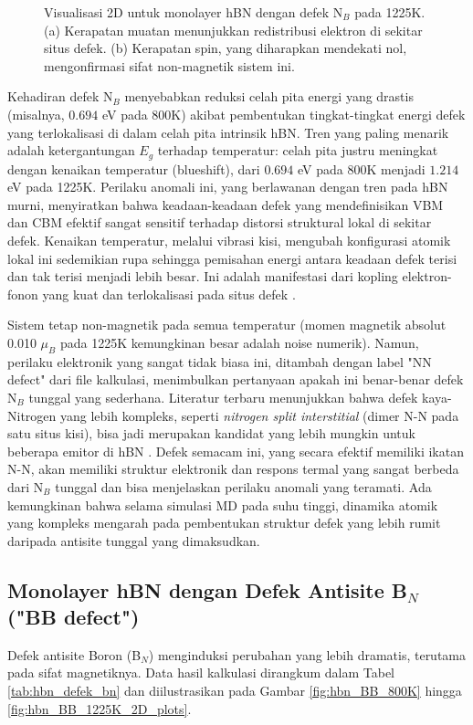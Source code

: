 \begin{figure}[h!]
    \caption{Visualisasi 2D untuk monolayer hBN dengan defek N$_B$ pada 1225K. 
    (a) Kerapatan muatan menunjukkan redistribusi elektron di sekitar situs defek. 
    (b) Kerapatan spin, yang diharapkan mendekati nol, mengonfirmasi sifat non-magnetik sistem ini.}
    \label{fig:hbn_NB_1225K_2D_plots}
\end{figure}

Kehadiran defek N$_B$ menyebabkan reduksi celah pita energi yang drastis (misalnya, $0.694$ eV pada 800K) akibat pembentukan tingkat-tingkat energi defek yang terlokalisasi di dalam celah pita intrinsik hBN. Tren yang paling menarik adalah ketergantungan $E_g$ terhadap temperatur: celah pita justru meningkat dengan kenaikan temperatur (blueshift), dari $0.694$ eV pada 800K menjadi $1.214$ eV pada 1225K. Perilaku anomali ini, yang berlawanan dengan tren pada hBN murni, menyiratkan bahwa keadaan-keadaan defek yang mendefinisikan VBM dan CBM efektif sangat sensitif terhadap distorsi struktural lokal di sekitar defek. Kenaikan temperatur, melalui vibrasi kisi, mengubah konfigurasi atomik lokal ini sedemikian rupa sehingga pemisahan energi antara keadaan defek terisi dan tak terisi menjadi lebih besar. Ini adalah manifestasi dari kopling elektron-fonon yang kuat dan terlokalisasi pada situs defek \citep{Grosso2020,ozan2025}.

Sistem tetap non-magnetik pada semua temperatur (momen magnetik absolut 0.010 $\mu_B$ pada 1225K kemungkinan besar adalah noise numerik). Namun, perilaku elektronik yang sangat tidak biasa ini, ditambah dengan label "NN defect" dari file kalkulasi, menimbulkan pertanyaan apakah ini benar-benar defek N$_B$ tunggal yang sederhana. Literatur terbaru menunjukkan bahwa defek kaya-Nitrogen yang lebih kompleks, seperti \textit{nitrogen split interstitial} (dimer N-N pada satu situs kisi), bisa jadi merupakan kandidat yang lebih mungkin untuk beberapa emitor di hBN \citep{ganyecz2024}. Defek semacam ini, yang secara efektif memiliki ikatan N-N, akan memiliki struktur elektronik dan respons termal yang sangat berbeda dari N$_B$ tunggal dan bisa menjelaskan perilaku anomali yang teramati. Ada kemungkinan bahwa selama simulasi MD pada suhu tinggi, dinamika atomik yang kompleks mengarah pada pembentukan struktur defek yang lebih rumit daripada antisite tunggal yang dimaksudkan.


\subsection{Monolayer hBN dengan Defek Antisite B$_N$ ("BB defect")}
\label{subsec:hbn_defek_bn}
Defek antisite Boron (B$_N$) menginduksi perubahan yang lebih dramatis, terutama pada sifat magnetiknya. Data hasil kalkulasi dirangkum dalam Tabel \ref{tab:hbn_defek_bn} dan diilustrasikan pada Gambar \ref{fig:hbn_BB_800K} hingga \ref{fig:hbn_BB_1225K_2D_plots}.

